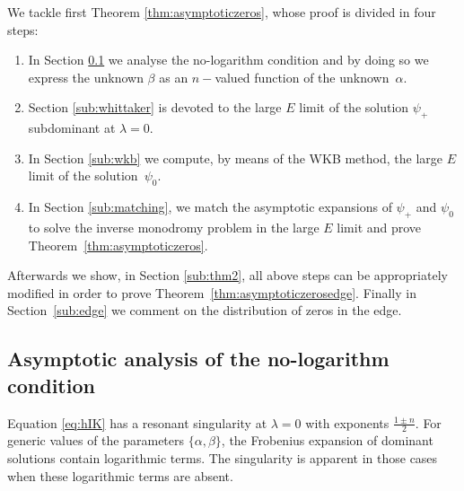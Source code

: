 \documentclass[pdftex]{sigma}
\numberwithin{equation}{section}
\newcommand{\la}{\lambda}
\newcommand{\al}{\alpha}
\begin{document}
We tackle f\/irst Theorem \ref{thm:asymptoticzeros}, whose proof is divided in four steps:
\begin{enumerate}\itemsep=0pt
 \item In Section \ref{sub:apparent} we analyse the no-logarithm condition and by doing so we express the unknown $\beta$ as an $n-$valued function of the unknown~$\al$.
\item Section \ref{sub:whittaker} is devoted to the large $E$ limit of the solution $\psi_+$ subdominant at $\la=0$.
\item In Section \ref{sub:wkb} we compute, by means of the WKB method, the large $E$ limit of the solu\-tion~$\psi_0$.
\item In Section \ref{sub:matching}, we match the asymptotic expansions of $\psi_+$ and $\psi_0$ to solve the inverse monodromy problem in the large $E$ limit and prove Theorem~\ref{thm:asymptoticzeros}.
\end{enumerate}
Afterwards we show, in Section \ref{sub:thm2}, all above steps can be appropriately modif\/ied in order to prove Theorem~\ref{thm:asymptoticzerosedge}. Finally in Section~\ref{sub:edge} we comment on the distribution of zeros in the edge.

\subsection{Asymptotic analysis of the no-logarithm condition}\label{sub:apparent}
Equation \eqref{eq:hIK} has a resonant singularity at $\la=0$ with exponents $\frac{1\pm n}{2}$. For generic values of the parameters $\{\al,\beta\}$, the Frobenius expansion of dominant solutions contain logarithmic terms. The singularity is apparent in those cases when these logarithmic terms are absent.
\end{document}
